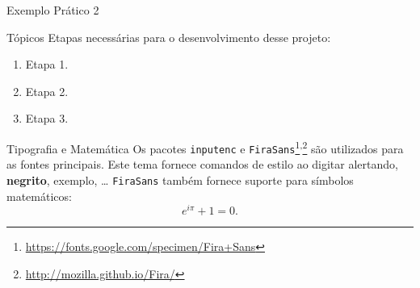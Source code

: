 \documentclass[aspectratio=169]{beamer}
\begin{document}
\begin{frame}{Exemplo Prático 2}
	\begin{figure}[!thp]
		\centering
		\hfil
	\end{figure}
\end{frame}
\begin{frame}{Tópicos}
	\vspace{-5cm}
	Etapas necessárias para o desenvolvimento desse projeto:
	\begin{enumerate}
		\item Etapa 1.
		\item Etapa 2.
		\item Etapa 3.
	\end{enumerate}
\end{frame}
\begin{frame}{Tipografia e Matemática}
	Os pacotes \texttt{inputenc} e \texttt{FiraSans}\footnote{\url{https://fonts.google.com/specimen/Fira+Sans}}\textsuperscript{,}\footnote{\url{http://mozilla.github.io/Fira/}} são utilizados para as fontes principais.
	\vfill
	Este tema fornece comandos de estilo ao digitar \alert{alertando}, \textbf{negrito}, \textcolor{example}{exemplo}, \dots
	\vfill
	\texttt{FiraSans} também fornece suporte para símbolos matemáticos:
	\begin{equation*}
	e^{i\pi} + 1 = 0.
	\end{equation*}
\end{frame}
\end{document}
